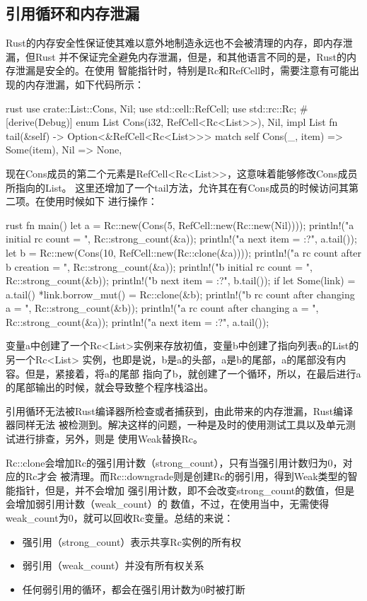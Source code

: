 \subsection{引用循环和内存泄漏}
Rust的内存安全性保证使其难以意外地制造永远也不会被清理的内存，即内存泄漏，但Rust
并不保证完全避免内存泄漏，但是，和其他语言不同的是，Rust的内存泄漏是安全的。在使用
智能指针时，特别是Rc和RefCell时，需要注意有可能出现的内存泄漏，如下代码所示：
\begin{code-block}{rust}
use crate::List::{Cons, Nil};
use std::cell::RefCell;
use std::rc::Rc;
#[derive(Debug)]
enum List {
    Cons(i32, RefCell<Rc<List>>),
    Nil,
}
impl List {
    fn tail(&self) -> Option<&RefCell<Rc<List>>> {
        match self {
            Cons(_, item) => Some(item),
            Nil => None,
        }
    }
}
\end{code-block}
现在Cons成员的第二个元素是RefCell<Rc<List>>，这意味着能够修改Cons成员所指向的List。
这里还增加了一个tail方法，允许其在有Cons成员的时候访问其第二项。在使用时候如下
进行操作：
\begin{code-block}{rust}
fn main() {
    let a = Rc::new(Cons(5, RefCell::new(Rc::new(Nil))));
    println!("a initial rc count = {}", Rc::strong_count(&a));
    println!("a next item = {:?}", a.tail());
    let b = Rc::new(Cons(10, RefCell::new(Rc::clone(&a))));
    println!("a rc count after b creation = {}", Rc::strong_count(&a));
    println!("b initial rc count = {}", Rc::strong_count(&b));
    println!("b next item = {:?}", b.tail());
    if let Some(link) = a.tail() {
        *link.borrow_mut() = Rc::clone(&b);
    }
    println!("b rc count after changing a = {}", Rc::strong_count(&b));
    println!("a rc count after changing a = {}", Rc::strong_count(&a));
    println!("a next item = {:?}", a.tail());
}
\end{code-block}
变量a中创建了一个Rc<List>实例来存放初值，变量b中创建了指向列表a的List的另一个Rc<List>
实例，也即是说，b是a的头部，a是b的尾部，a的尾部没有内容。但是，紧接着，将a的尾部
指向了b，就创建了一个循环，所以，在最后进行a的尾部输出的时候，就会导致整个程序栈溢出。

引用循环无法被Rust编译器所检查或者捕获到，由此带来的内存泄漏，Rust编译器同样无法
被检测到。解决这样的问题，一种是及时的使用测试工具以及单元测试进行排查，另外，则是
使用Weak替换Rc。

Rc::clone会增加Rc的强引用计数（strong\_count），只有当强引用计数归为0，对应的Rc才会
被清理。而Rc::downgrade则是创建Rc的弱引用，得到Weak类型的智能指针，但是，并不会增加
强引用计数，即不会改变strong\_count的数值，但是会增加弱引用计数（weak\_count）的
数值，不过，在使用当中，无需使得weak\_count为0，就可以回收Rc变量。总结的来说：
\begin{itemize}
  \item 强引用（strong\_count）表示共享Rc实例的所有权
  \item 弱引用（weak\_count）并没有所有权关系
  \item 任何弱引用的循环，都会在强引用计数为0时被打断
\end{itemize}

